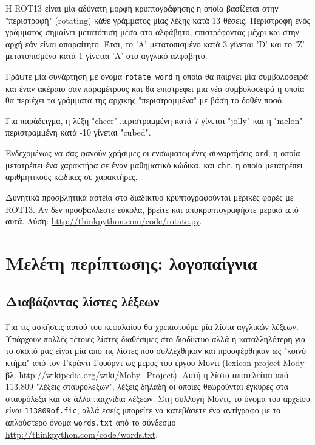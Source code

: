 \documentclass[10pt]{book}
\begin{document}
\begin{exercise}

\label{exrotate}
Η ROT13 είναι μία αδύνατη μορφή κρυπτογράφησης η οποία βασίζεται στην "περιστροφή" (rotating) κάθε γράμματος μίας λέξης κατά 13 θέσεις. Περιστροφή ενός γράμματος σημαίνει μετατόπιση μέσα στο αλφάβητο, επιστρέφοντας μέχρι και στην αρχή εάν είναι απαραίτητο. Έτσι, το 'A' μετατοπισμένο κατά 3 γίνεται 'D' και το 'Z' μετατοπισμένο κατά 1 γίνεται 'A' στο αγγλικό αλφάβητο.

Γράψτε μία συνάρτηση με όνομα \verb"rotate_word" η οποία θα παίρνει μία συμβολοσειρά και έναν ακέραιο σαν παραμέτρους και θα επιστρέφει μία νέα συμβολοσειρά η οποία θα περιέχει τα γράμματα της αρχικής "περιστραμμένα" με βάση το δοθέν ποσό.

Για παράδειγμα, η λέξη "cheer" περιστραμμένη κατά 7 γίνεται "jolly" και η "melon" περιστραμμένη κατά -10 γίνεται "cubed". 


Ενδεχομένως να σας φανούν χρήσιμες οι ενσωματωμένες συναρτήσεις {\tt ord}, η οποία μετατρέπει ένα χαρακτήρα σε έναν μαθηματικό κώδικα, και {\tt chr}, η οποία μετατρέπει αριθμητικούς κώδικες σε χαρακτήρες.

Δυνητικά προσβλητικά αστεία στο διαδίκτυο κρυπτογραφούνται μερικές φορές με  ROT13. Αν δεν προσβάλλεστε εύκολα, βρείτε και αποκρυπτογραφήστε μερικά από αυτά. Λύση: \url{http://thinkpython.com/code/rotate.py}. 

\end{exercise}



\chapter{Μελέτη περίπτωσης: λογοπαίγνια}

\section{Διαβάζοντας λίστες λέξεων}
\label{wordlist}

Για τις ασκήσεις αυτού του κεφαλαίου θα χρειαστούμε μία λίστα αγγλικών λέξεων. Υπάρχουν πολλές τέτοιες λίστες διαθέσιμες στο διαδίκτυο αλλά η καταλληλότερη για το σκοπό μας είναι μία από τις λίστες που συλλέχθηκαν και προσφέρθηκαν ως  "κοινό κτήμα" από τον Γκράντι Γουόρντ ως μέρος του έργου Μόντι (lexicon project Mody βλ. \url{http://wikipedia.org/wiki/Moby_Project}). Αυτή η λίστα αποτελείται από 113.809 "λέξεις σταυρόλεξων", λέξεις δηλαδή οι οποίες θεωρούνται έγκυρες στα σταυρόλεξα και σε άλλα παιχνίδια λέξεων. Στη συλλογή Μόντι, το όνομα του αρχείου είναι {\tt 113809of.fic}, αλλά εσείς μπορείτε να κατεβάσετε ένα αντίγραφο με το απλούστερο όνομα {\tt words.txt} από το σύνδεσμο  \url{http://thinkpython.com/code/words.txt}.
\end{document}
